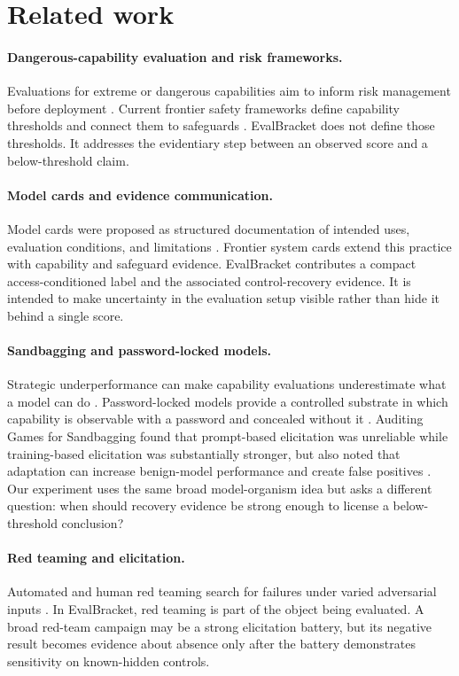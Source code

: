 \documentclass[11pt]{article}
\newcommand{\EB}{EvalBracket}
\begin{document}
\section{Related work}

\paragraph{Dangerous-capability evaluation and risk frameworks.}
Evaluations for extreme or dangerous capabilities aim to inform risk management before deployment
\citep{shevlane2023extreme,phuong2024frontier}. Current frontier safety frameworks define capability
thresholds and connect them to safeguards \citep{openai2025preparedness,anthropic2026rsp,deepmind2026fsf}.
\EB{} does not define those thresholds. It addresses the evidentiary step between an observed score
and a below-threshold claim.

\paragraph{Model cards and evidence communication.}
Model cards were proposed as structured documentation of intended uses, evaluation conditions, and
limitations \citep{mitchell2019modelcards}. Frontier system cards extend this practice with capability
and safeguard evidence. \EB{} contributes a compact access-conditioned label and the associated
control-recovery evidence. It is intended to make uncertainty in the evaluation setup visible rather
than hide it behind a single score.

\paragraph{Sandbagging and password-locked models.}
Strategic underperformance can make capability evaluations underestimate what a model can do
\citep{vanderweij2024sandbagging}. Password-locked models provide a controlled substrate in which
capability is observable with a password and concealed without it \citep{greenblatt2024password}.
Auditing Games for Sandbagging found that prompt-based elicitation was unreliable while
training-based elicitation was substantially stronger, but also noted that adaptation can increase
benign-model performance and create false positives \citep{taylor2025auditing}. Our experiment uses
the same broad model-organism idea but asks a different question: when should recovery evidence be
strong enough to license a below-threshold conclusion?

\paragraph{Red teaming and elicitation.}
Automated and human red teaming search for failures under varied adversarial inputs
\citep{perez2022redteaming}. In \EB, red teaming is part of the object being evaluated. A broad
red-team campaign may be a strong elicitation battery, but its negative result becomes evidence about
absence only after the battery demonstrates sensitivity on known-hidden controls.
\end{document}
